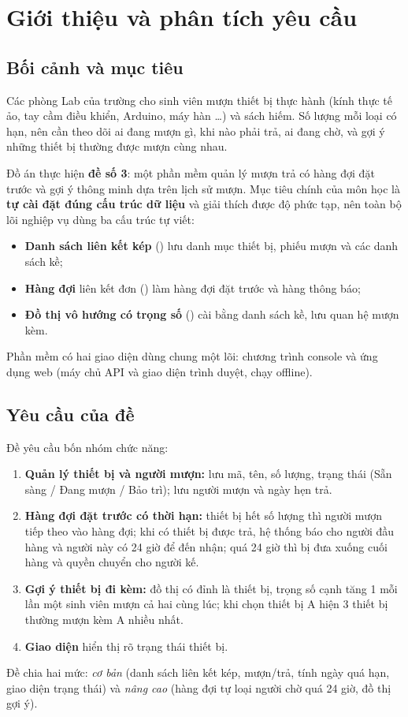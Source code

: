 \chapter{Giới thiệu và phân tích yêu cầu}

\section{Bối cảnh và mục tiêu}
Các phòng Lab của trường cho sinh viên mượn thiết bị thực hành (kính thực tế ảo, tay cầm điều khiển, Arduino, máy hàn \ldots) và sách hiếm. Số lượng mỗi loại có hạn, nên cần theo dõi ai đang mượn gì, khi nào phải trả, ai đang chờ, và gợi ý những thiết bị thường được mượn cùng nhau.

Đồ án thực hiện \textbf{đề số 3}: một phần mềm quản lý mượn trả có hàng đợi đặt trước và gợi ý thông minh dựa trên lịch sử mượn. Mục tiêu chính của môn học là \textbf{tự cài đặt đúng cấu trúc dữ liệu} và giải thích được độ phức tạp, nên toàn bộ lõi nghiệp vụ dùng ba cấu trúc tự viết:
\begin{itemize}
  \item \textbf{Danh sách liên kết kép} () lưu danh mục thiết bị, phiếu mượn và các danh sách kề;
  \item \textbf{Hàng đợi} liên kết đơn () làm hàng đợi đặt trước và hàng thông báo;
  \item \textbf{Đồ thị vô hướng có trọng số} () cài bằng danh sách kề, lưu quan hệ mượn kèm.
\end{itemize}
Phần mềm có hai giao diện dùng chung một lõi: chương trình console  và ứng dụng web  (máy chủ API và giao diện trình duyệt, chạy offline).

\section{Yêu cầu của đề}
Đề yêu cầu bốn nhóm chức năng:
\begin{enumerate}
  \item \textbf{Quản lý thiết bị và người mượn:} lưu mã, tên, số lượng, trạng thái (Sẵn sàng / Đang mượn / Bảo trì); lưu người mượn và ngày hẹn trả.
  \item \textbf{Hàng đợi đặt trước có thời hạn:} thiết bị hết số lượng thì người mượn tiếp theo vào hàng đợi; khi có thiết bị được trả, hệ thống báo cho người đầu hàng và người này có 24 giờ để đến nhận; quá 24 giờ thì bị đưa xuống cuối hàng và quyền chuyển cho người kế.
  \item \textbf{Gợi ý thiết bị đi kèm:} đồ thị có đỉnh là thiết bị, trọng số cạnh tăng 1 mỗi lần một sinh viên mượn cả hai cùng lúc; khi chọn thiết bị A hiện 3 thiết bị thường mượn kèm A nhiều nhất.
  \item \textbf{Giao diện} hiển thị rõ trạng thái thiết bị.
\end{enumerate}
Đề chia hai mức: \emph{cơ bản} (danh sách liên kết kép, mượn/trả, tính ngày quá hạn, giao diện trạng thái) và \emph{nâng cao} (hàng đợi tự loại người chờ quá 24 giờ, đồ thị gợi ý).

